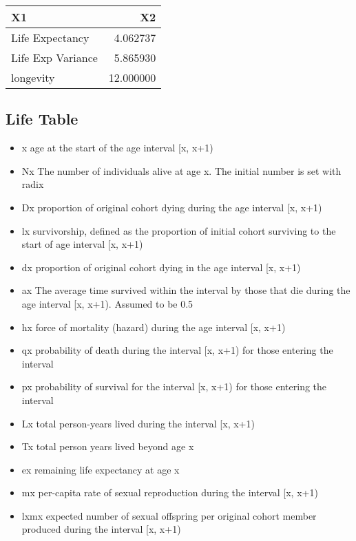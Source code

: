\documentclass[
]{article}
\providecommand{\tightlist}{%
  \setlength{\itemsep}{0pt}\setlength{\parskip}{0pt}}
\begin{document}
\begin{tabular}{lr}
\toprule
X1 & X2\\
\midrule
Life Expectancy & 4.062737\\
Life Exp Variance & 5.865930\\
longevity & 12.000000\\
\bottomrule
\end{tabular}

\newpage

\hypertarget{life-table}{%
\subsection{Life Table}\label{life-table}}

\begin{itemize}
\tightlist
\item
  x age at the start of the age interval {[}x, x+1)
\item
  Nx The number of individuals alive at age x. The initial number is set
  with radix
\item
  Dx proportion of original cohort dying during the age interval {[}x,
  x+1)
\item
  lx survivorship, defined as the proportion of initial cohort surviving
  to the start of age interval {[}x, x+1)
\item
  dx proportion of original cohort dying in the age interval {[}x, x+1)
\item
  ax The average time survived within the interval by those that die
  during the age interval {[}x, x+1). Assumed to be 0.5
\item
  hx force of mortality (hazard) during the age interval {[}x, x+1)
\item
  qx probability of death during the interval {[}x, x+1) for those
  entering the interval
\item
  px probability of survival for the interval {[}x, x+1) for those
  entering the interval
\item
  Lx total person-years lived during the interval {[}x, x+1)
\item
  Tx total person years lived beyond age x
\item
  ex remaining life expectancy at age x
\item
  mx per-capita rate of sexual reproduction during the interval {[}x,
  x+1)
\item
  lxmx expected number of sexual offspring per original cohort member
  produced during the interval {[}x, x+1)
\end{itemize}
\end{document}
